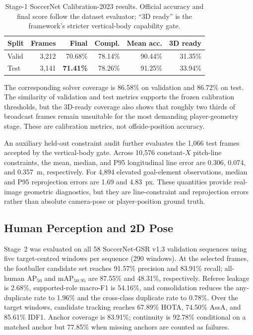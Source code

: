 \documentclass[runningheads]{llncs}
\begin{document}
\begin{table}[H]
\centering
\caption{Stage-1 SoccerNet Calibration-2023 results. Official accuracy and final score follow the dataset evaluator; ``3D ready'' is the framework's stricter vertical-body capability gate.}
\label{tab:camera_results}
\small
\begin{tabular}{lrrrrr}
\toprule
Split & Frames & Final & Compl. & Mean acc. & 3D ready \\
\midrule
Valid & 3,212 & 70.68\% & 78.14\% & 90.44\% & 31.35\% \\
Test & 3,141 & \textbf{71.41\%} & 78.26\% & 91.25\% & 33.94\% \\
\bottomrule
\end{tabular}
\end{table}

The corresponding solver coverage is 86.58\% on validation and 86.72\% on test. The similarity of validation and test metrics supports the frozen calibration thresholds, but the 3D-ready coverage also shows that roughly two thirds of broadcast frames remain unsuitable for the most demanding player-geometry stage. These are calibration metrics, not offside-position accuracy.

An auxiliary held-out constraint audit further evaluates the 1,066 test frames accepted by the vertical-body gate. Across 10,576 constant-$X$ pitch-line constraints, the mean, median, and P95 longitudinal line error are 0.306, 0.074, and 0.357~m, respectively. For 4,894 elevated goal-element observations, median and P95 reprojection errors are 1.69 and 4.83~px. These quantities provide real-image geometric diagnostics, but they are line-constraint and reprojection errors rather than absolute camera-pose or player-position ground truth.

\subsection{Human Perception and 2D Pose}
\label{subsec:results_human}
Stage~2 was evaluated on all 58 SoccerNet-GSR v1.3 validation sequences using five target-centred windows per sequence (290 windows). At the selected frames, the footballer candidate set reaches 91.57\% precision and 83.91\% recall; all-human AP$_{50}$ and mAP$_{50:95}$ are 87.55\% and 48.31\%, respectively. Referee leakage is 2.68\%, supported-role macro-F1 is 54.16\%, and consolidation reduces the any-duplicate rate to 1.96\% and the cross-class duplicate rate to 0.78\%. Over the target windows, candidate tracking reaches 67.89\% HOTA, 74.50\% AssA, and 85.61\% IDF1. Anchor coverage is 83.91\%; continuity is 92.78\% conditional on a matched anchor but 77.85\% when missing anchors are counted as failures.
\end{document}
